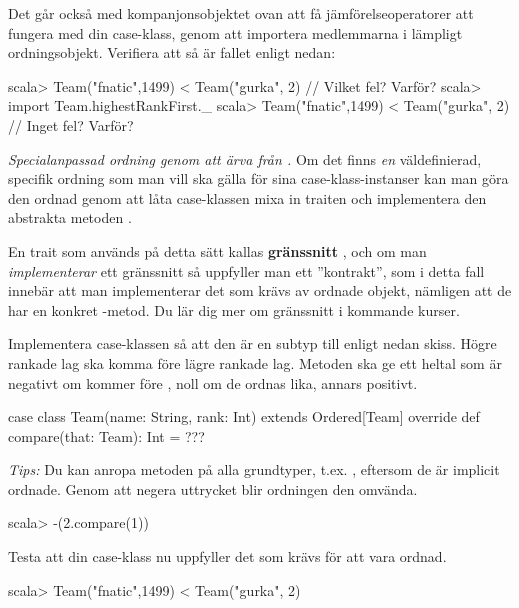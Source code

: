 \Subtask Det går också med kompanjonsobjektet ovan att få jämförelseoperatorer att fungera med din case-klass, genom att importera medlemmarna i lämpligt ordningsobjekt. Verifiera att så är fallet enligt nedan:
\begin{REPL}
scala> Team("fnatic",1499) < Team("gurka", 2)  // Vilket fel? Varför?
scala> import Team.highestRankFirst._
scala> Team("fnatic",1499) < Team("gurka", 2)  // Inget fel? Varför?
\end{REPL}


\Task \emph{Specialanpassad ordning genom att ärva från .} Om det finns \emph{en} väldefinierad, specifik ordning som man vill ska gälla för sina case-klass-instanser kan man göra den ordnad genom att låta case-klassen mixa in traiten  och implementera den abstrakta metoden . 

\begin{Background}
En trait som används på detta sätt kallas \textbf{gränssnitt} , och om man \emph{implementerar} ett gränssnitt så uppfyller man ett ''kontrakt'', som i detta fall innebär att man implementerar det som krävs av ordnade objekt, nämligen att de har en konkret -metod. Du lär dig mer om gränssnitt i kommande kurser. 
\end{Background}

\Subtask Implementera case-klassen  så att den är en subtyp till  enligt nedan skiss. Högre rankade lag ska komma före lägre rankade lag. Metoden  ska ge ett heltal som är negativt om  kommer före , noll om de ordnas lika, annars positivt. 

\begin{Code}
case class Team(name: String, rank: Int) extends Ordered[Team]{
  override def compare(that: Team): Int = ???
} 
\end{Code}
\emph{Tips:} Du kan anropa metoden  på alla grundtyper, t.ex. , eftersom de är implicit ordnade. Genom att negera uttrycket blir ordningen den omvända.
\begin{REPL}
scala> -(2.compare(1))  
\end{REPL}

\Subtask Testa att  din case-klass nu uppfyller det som krävs för att vara ordnad. 
\begin{REPL}
scala> Team("fnatic",1499) < Team("gurka", 2) 
\end{REPL}



